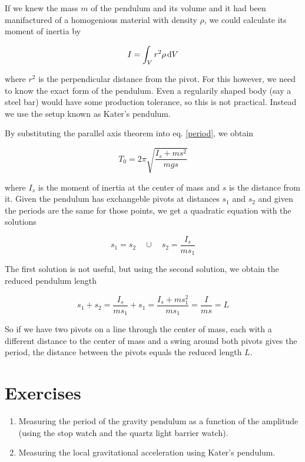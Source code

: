 \documentclass[a4paper,german,12pt,smallheadings]{scrartcl}
\begin{document}
If we knew the mass $m$ of the pendulum and its volume and it had been
manifactured of a homogenious material with density $\rho$, we could calculate
its moment of inertia by

\begin{equation}
  I = \int_V r^2 \rho \dif V
\end{equation}

where $r^2$ is the perpendicular distance from the pivot. For this however, we
need to know the exact form of the pendulum. Even a regularily shaped body (say
a steel bar) would have some production tolerance, so this is not practical.
Instead we use the setup known as Kater's pendulum.

By substituting the parallel axis theorem into eq. \ref{period}, we obtain

\begin{equation}
  T_{0} = 2 \pi \sqrt{\frac{I_s + ms^2}{mgs}}
\end{equation}

where $I_s$ is the moment of inertia at the center of mass and $s$ is the
distance from it. Given the pendulum has exchangeble pivots at distances $s_1$
and $s_2$ and given the periods are the same for those points, we get a
quadratic equation with the solutions

\begin{equation}
  s_1 = s_2 \quad \cup \quad s_2 = \frac{I_s}{m s_1}
\end{equation}

The first solution is not useful, but using the second solution, we obtain the
reduced pendulum length

\begin{equation}
  s_1 + s_2 = \frac{I_s}{ms_1} + s_1 = \frac{I_s + ms_1^2}{ms_1} = \frac{I}{ms} = L
\end{equation}

So if we have two pivots on a line through the center of mass, each with a
different distance to the center of mass and a swing around both pivots gives
the period, the distance between the pivots equals the reduced length $L$.

\section*{Exercises}
\begin{enumerate}
  \item Measuring the period of the gravity pendulum as a function of the
    amplitude (using the stop watch and the quartz light barrier watch).
  \item Measuring the local gravitational acceleration using Kater's pendulum.
\end{enumerate}
\end{document}
